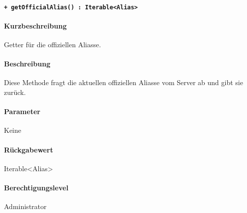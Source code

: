 \paragraph{\texttt{+ getOfficialAlias() : Iterable<Alias>}}\label{AP_Backend_getOfficialAlias}%
\paragraph*{Kurzbeschreibung}
Getter für die offiziellen Aliasse.
\paragraph*{Beschreibung}
Diese Methode fragt die aktuellen offiziellen Aliasse vom Server ab und gibt sie zurück.
\paragraph*{Parameter}
Keine
\paragraph*{Rückgabewert}
Iterable<Alias>
\paragraph*{Berechtigungslevel}
Administrator